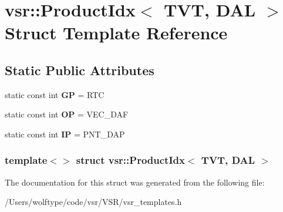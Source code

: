 \hypertarget{structvsr_1_1_product_idx_3_01_t_v_t_00_01_d_a_l_01_4}{\section{vsr\-:\-:Product\-Idx$<$ T\-V\-T, D\-A\-L $>$ Struct Template Reference}
\label{structvsr_1_1_product_idx_3_01_t_v_t_00_01_d_a_l_01_4}
}
\subsection*{Static Public Attributes}
\begin{DoxyCompactItemize}
\item 
\hypertarget{structvsr_1_1_product_idx_3_01_t_v_t_00_01_d_a_l_01_4_a23483f272668eb69d4c21ea16b50051e}{static const int {\bfseries G\-P} = R\-T\-C}\label{structvsr_1_1_product_idx_3_01_t_v_t_00_01_d_a_l_01_4_a23483f272668eb69d4c21ea16b50051e}

\item 
\hypertarget{structvsr_1_1_product_idx_3_01_t_v_t_00_01_d_a_l_01_4_af90c97991a038d8f8394d6f8c12d7ee2}{static const int {\bfseries O\-P} = V\-E\-C\-\_\-\-D\-A\-F}\label{structvsr_1_1_product_idx_3_01_t_v_t_00_01_d_a_l_01_4_af90c97991a038d8f8394d6f8c12d7ee2}

\item 
\hypertarget{structvsr_1_1_product_idx_3_01_t_v_t_00_01_d_a_l_01_4_acdea90bbbaa91113d48567b999f85af4}{static const int {\bfseries I\-P} = P\-N\-T\-\_\-\-D\-A\-P}\label{structvsr_1_1_product_idx_3_01_t_v_t_00_01_d_a_l_01_4_acdea90bbbaa91113d48567b999f85af4}

\end{DoxyCompactItemize}
\subsubsection*{template$<$$>$ struct vsr\-::\-Product\-Idx$<$ T\-V\-T, D\-A\-L $>$}



The documentation for this struct was generated from the following file\-:\begin{DoxyCompactItemize}
\item 
/\-Users/wolftype/code/vsr/\-V\-S\-R/vsr\-\_\-templates.\-h\end{DoxyCompactItemize}
